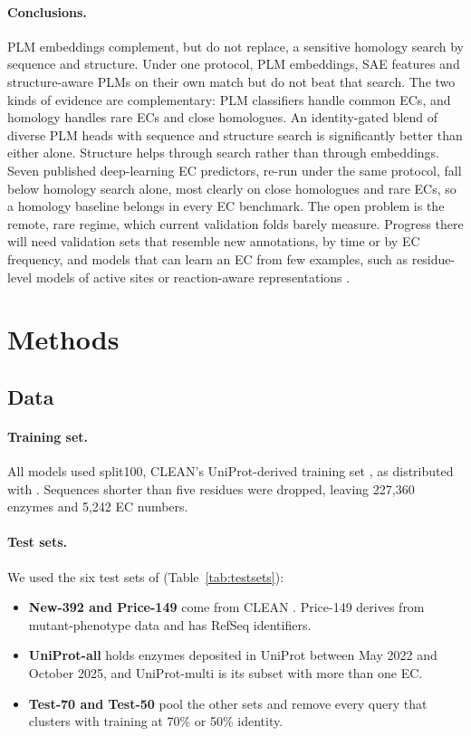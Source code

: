 \documentclass[11pt]{article}
\begin{document}
\paragraph{Conclusions.}
PLM embeddings complement, but do not replace, a sensitive homology search by sequence and structure. Under
one protocol, PLM embeddings, SAE features and structure-aware PLMs on their own match but do not beat that search. The two kinds of evidence are complementary: PLM classifiers
handle common ECs, and homology handles rare ECs and close homologues. An identity-gated blend of diverse PLM heads
with sequence and structure search is significantly better than either alone. Structure helps through search rather
than through embeddings. Seven published deep-learning EC predictors, re-run under the same protocol, fall below
homology search alone, most clearly on close homologues and rare ECs, so a homology baseline belongs in every EC
benchmark. The open problem is the remote, rare regime, which current validation folds barely measure. Progress there
will need validation sets that resemble new annotations, by time or by EC frequency, and models that can learn an EC
from few examples, such as residue-level models of active sites or reaction-aware representations \cite{care}.

\section{Methods}

\subsection{Data}

\paragraph{Training set.} All models used split100, CLEAN's UniProt-derived training set \cite{clean}, as distributed
with \cite{milbc}. Sequences shorter than five residues were dropped, leaving 227,360 enzymes and 5,242 EC numbers.

\paragraph{Test sets.} We used the six test sets of \cite{milbc} (Table~\ref{tab:testsets}):
\begin{itemize}
  \item \textbf{New-392 and Price-149} come from CLEAN \cite{clean}. Price-149 derives from mutant-phenotype data
        \cite{price2018} and has RefSeq identifiers.
  \item \textbf{UniProt-all} holds enzymes deposited in UniProt between May 2022 and October 2025, and UniProt-multi
        is its subset with more than one EC.
  \item \textbf{Test-70 and Test-50} pool the other sets and remove every query that clusters with training at 70\% or
        50\% identity.
\end{itemize}
\end{document}
